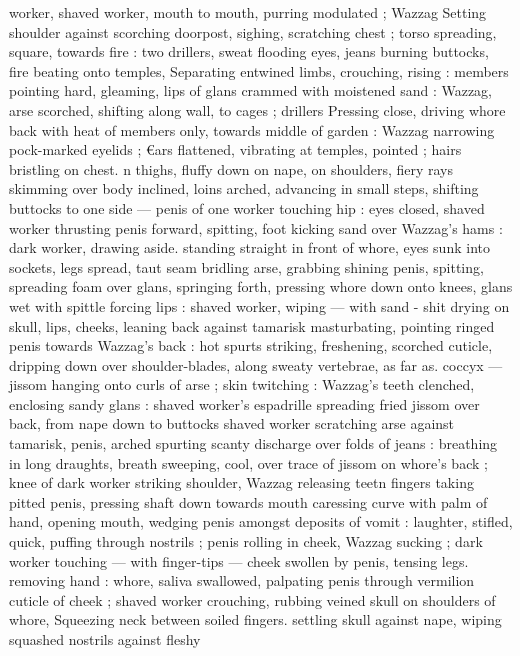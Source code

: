 worker, shaved worker, mouth to mouth, purring modulated ; Wazzag 
Setting shoulder against scorching doorpost, sighing, scratching 
chest ; torso spreading, square, towards fire : two drillers, sweat 
flooding eyes, jeans burning buttocks, fire beating onto temples, 
Separating entwined limbs, crouching, rising : members pointing 
hard, gleaming, lips of glans crammed with moistened sand : 
Wazzag, arse scorched, shifting along wall, to cages ; drillers 
Pressing close, driving whore back with heat of members only, 
towards middle of garden : Wazzag narrowing pock-marked eyelids ; 
€ars flattened, vibrating at temples, pointed ; hairs bristling on chest. 
n thighs, fluffy down on nape, on shoulders, fiery rays skimming 
over body inclined, loins arched, advancing in small steps, shifting 
buttocks to one side --- penis of one worker touching hip : eyes 
closed, shaved worker thrusting penis forward, spitting, foot kicking 
sand over Wazzag's hams : dark worker, drawing aside. standing 
straight in front of whore, eyes sunk into sockets, legs spread, taut 
seam bridling arse, grabbing shining penis, spitting, spreading foam 
over glans, springing forth, pressing whore down onto knees, glans 
wet with spittle forcing lips : shaved worker, wiping --- with sand - 
shit drying on skull, lips, cheeks, leaning back against tamarisk 
masturbating, pointing ringed penis towards Wazzag's back : hot 
spurts striking, freshening, scorched cuticle, dripping down over 
shoulder-blades, along sweaty vertebrae, as far as. coccyx --- jissom 
hanging onto curls of arse ; skin twitching : Wazzag's teeth 
clenched, enclosing sandy glans : shaved worker's espadrille 
spreading fried jissom over back, from nape down to buttocks 
shaved worker scratching arse against tamarisk, penis, arched 
spurting scanty discharge over folds of jeans : breathing in long 
draughts, breath sweeping, cool, over trace of jissom on whore's 
back ; knee of dark worker striking shoulder, Wazzag releasing teetn 
fingers taking pitted penis, pressing shaft down towards mouth 
caressing curve with palm of hand, opening mouth, wedging penis 
amongst deposits of vomit : laughter, stifled, quick, puffing through 
nostrils ; penis rolling in cheek, Wazzag sucking ; dark worker 
touching --- with finger-tips --- cheek swollen by penis, tensing legs. 
removing hand : whore, saliva swallowed, palpating penis through 
vermilion cuticle of cheek ; shaved worker crouching, rubbing veined 
skull on shoulders of whore, Squeezing neck between soiled fingers. 
settling skull against nape, wiping squashed nostrils against fleshy 
